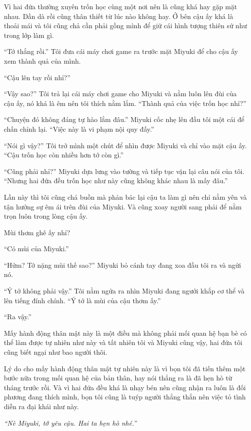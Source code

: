 {Vì hai đứa thường xuyên trốn học cùng một nơi nên là cũng khá hay gặp
mặt nhau. Dần dà rồi cũng thân thiết từ lúc nào không hay. Ở bên cậu ấy
khá là thoải mái và tôi cũng chả cần phải gồng mình để giữ cái hình
tượng thiên sứ như trong lớp làm gì.

``Tớ thắng rồi.'' Tôi đưa cái máy chơi game ra trước mặt Miyuki để cho
cậu ấy xem thành quả của mình.

``Cậu lên tay rồi nhỉ?''

``Vậy sao?'' Tôi trả lại cái máy chơi game cho Miyuki và nằm luôn lên
đùi của cậu ấy, nó khá là êm nên tôi thích nằm lắm. ``Thành quả của việc
trốn học nhỉ?''

``Chuyện đó không đáng tự hào lắm đâu.'' Miyuki cốc nhẹ lên đầu tôi một
cái để chấn chỉnh lại. ``Việc này là vi phạm nội quy đấy.''

``Nói gì vậy?'' Tôi trở mình một chút để nhìn được Miyuki và chỉ vào mặt
cậu ấy. ``Cậu trốn học còn nhiều hơn tớ còn gì.''

``Cũng phải nhỉ?'' Miyuki dựa lưng vào tường và tiếp tục vặn lại câu nói
của tôi. ``Nhưng hai đứa đều trốn học như này cũng không khác nhau là
mấy đâu.''

Lần này thì tôi cũng chả buồn mà phản bác lại cậu ta làm gì nên chỉ nằm
yên và tận hưởng sự êm ái trên đùi của Miyuki. Và cũng xoay người sang
phải để nằm trọn luôn trong lòng cậu ấy.

Mùi thơm ghê ấy nhỉ?

``Có mùi của Miyuki.''

``Hửm? Tớ nặng mùi thế sao?'' Miyuki bỏ cánh tay đang xoa đầu tôi ra và
ngửi nó.

``Ý tớ không phải vậy.'' Tôi nằm ngửa ra nhìn Miyuki đang ngưởi khắp cơ
thể và lên tiếng đính chính. ``Ý tớ là mùi của cậu thơm ấy.''

``Ra vậy.''

Mấy hành động thân mật này là một điều mà không phải mối quan hệ bạn bè
có thể làm được tự nhiên như này và tất nhiên tôi và Miyuki cũng vậy,
hai đứa tôi cũng biết ngại như bao người thôi.

Lý do cho mấy hành động thân mật tự nhiên này là vì bọn tôi đã tiến thêm
một bước nữa trong mối quan hệ của bản thân, hay nói thẳng ra là đã hẹn
hò từ tháng trước rồi. Và vì hai đứa đều khá là nhạy bén nên cũng nhận
ra luôn là đối phương đang thích mình, bọn tôi cũng là tuýp người thẳng
thắn nên việc tỏ tình diễn ra đại khái như này.

\emph{``Nè Miyuki, tớ yêu cậu. Hai ta hẹn hò nhé.''}

}
